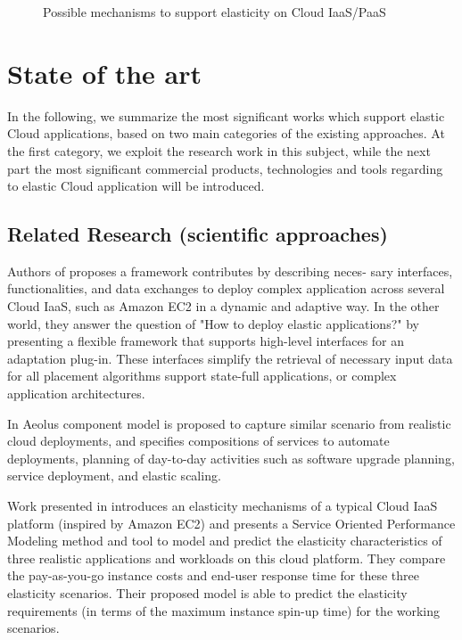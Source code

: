 \documentclass{sig-alternate}
\begin{document}
\begin{figure*}
\centering
{}
\caption{Possible mechanisms to support elasticity on Cloud IaaS/PaaS ~\cite{vaquero2011dynamically}}
\label{fig:scalabilitymechanisms}
\end{figure*}

\section{State of the art}{\label{rw}
In the following, we summarize the most significant works which support elastic Cloud applications, based on two main categories of the existing approaches.
At the first category, we exploit the research work in this subject, while the next part the most significant commercial products, technologies and tools regarding to elastic Cloud application will be introduced.

\subsection{Related Research (scientific approaches)}
Authors of \cite{keller2013topology} proposes a framework contributes by describing neces-
sary interfaces, functionalities, and data exchanges to deploy complex application across several Cloud IaaS, such as Amazon EC2 in a dynamic and adaptive way. In the other world, they answer the question of "How to deploy elastic applications?" by presenting a flexible framework that supports high-level interfaces for an adaptation plug-in. These interfaces simplify the retrieval of necessary input data for all placement algorithms support state-full applications, or complex application architectures.

In \cite{di2012towards} Aeolus component model is proposed to capture similar scenario from realistic cloud deployments, and specifies compositions of services to automate deployments, planning of day-to-day activities such as software upgrade planning, service deployment, and elastic scaling.

Work presented in \cite{brebner2012your} introduces an elasticity mechanisms of a typical Cloud IaaS platform (inspired by Amazon EC2) and presents a Service Oriented Performance Modeling method and tool to model and predict the elasticity characteristics of three realistic applications and workloads on this cloud platform. They compare the pay-as-you-go instance costs and end-user response time for these three elasticity scenarios. Their proposed model is able to predict the elasticity requirements (in terms of the maximum instance spin-up time) for the working scenarios.

}
\end{document}
